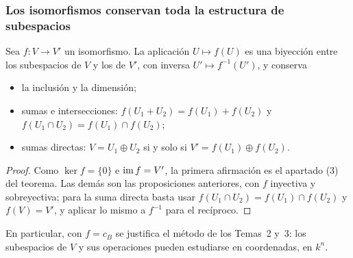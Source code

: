 \begin{frame}[allowframebreaks, t]
    \frametitle{Los isomorfismos conservan toda la estructura de subespacios}

    \begin{corollary}
        Sea $f\colon V\to V'$ un isomorfismo. La aplicación
        $U\mapsto f(U)$ es una biyección entre los subespacios de $V$ y los
        de $V'$, con inversa $U'\mapsto f^{-1}(U')$, y conserva
        \begin{itemize}
            \item la inclusión y la dimensión;
            \item sumas e intersecciones: $f(U_1+U_2)=f(U_1)+f(U_2)$ y
            $f(U_1\cap U_2)=f(U_1)\cap f(U_2)$;
            \item sumas directas: $V=U_1\oplus U_2$ si y solo si
            $V'=f(U_1)\oplus f(U_2)$.
        \end{itemize}
    \end{corollary}

    \framebreak

    \begin{proof}
        Como $\ker f=\{0\}$ e $\operatorname{im} f=V'$, la primera afirmación es el
        apartado (3) del teorema. Las demás son las proposiciones
        anteriores, con $f$ inyectiva y sobreyectiva; para la suma directa
        basta usar $f(U_1\cap U_2)=f(U_1)\cap f(U_2)$ y $f(V)=V'$, y
        aplicar lo mismo a $f^{-1}$ para el recíproco.
    \end{proof}

    \medskip

    En particular, con $f=c_B$ se justifica el método de los Temas~2 y~3:
    los subespacios de $V$ y sus operaciones pueden estudiarse en
    coordenadas, en $k^n$.
\end{frame}
